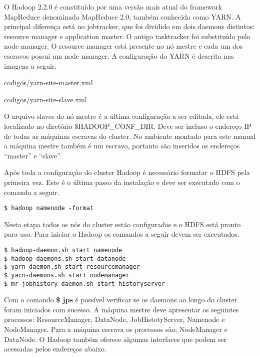 \begin{apendicesenv}
O Hadoop 2.2.0 é constituído por uma versão mais atual do framework MapReduce denominada MapReduce 2.0, também conhecida como YARN. A principal diferença está no jobtracker, que foi dividido em dois daemons distintos: resource manager e application master. O antigo tasktracker foi substituído pelo node manager. O resource manager está presente no nó mestre e cada um dos escravos possui um node manager. A configuração do YARN é descrita nas imagens a seguir.


		{codigos/yarn-site-master.xml}


		{codigos/yarn-site-slave.xml}


O arquivo slaves do nó mestre é a última configuração a ser editada, ele está localizado no diretório \$HADOOP\_CONF\_DIR. Deve ser incluso o endereço IP de todas as máquinas escravas do cluster. No ambiente montado para este manual a máquina mestre também é um escravo, portanto são inseridos os endereços “master” e “slave”.

Após toda a configuração do cluster Hadoop é necessário formatar o HDFS pela primeira vez. Este é o última passo da instalação e deve ser executado com o comando a seguir.

\begin{lstlisting}[style=abnt,frame=single]
$ hadoop namenode -format
\end{lstlisting}

Nesta etapa todos os nós do cluster estão configurados e o HDFS está pronto para uso. Para iniciar o Hadoop os comandos a seguir devem ser executados.

\begin{lstlisting}[style=abnt,frame=single]
$ hadoop-daemon.sh start namenode 
$ hadoop-daemons.sh start datanode 
$ yarn-daemon.sh start resourcemanager 
$ yarn-daemons.sh start nodemanager 
$ mr-jobhistory-daemon.sh start historyserver
\end{lstlisting}

Com o comando \textbf{\$ jps} é possível verificar se os daemons ao longo do cluster foram iniciados com sucesso. A máquina mestre deve apresentar os seguintes processos: ResourceManager, DataNode, JobHistotyServer, Namenode e NodeManager. Para a máquina escrava os processos são: NodeManager e DataNode. O Hadoop também oferece algumas interfaces que podem ser acessadas pelos endereços abaixo.


\end{apendicesenv}
